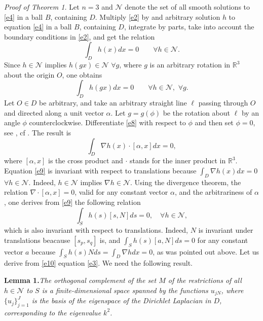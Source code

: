 \documentclass[12pt,leqno]{article}
\def\R{\mathbb{R}}
\begin{document}
{\it Proof of Theorem 1.} Let $n=3$ and $\mathcal{N}$ denote the set of
all smooth solutions to \eqref{e4} in a ball $B$, containing $D$.
Multiply \eqref{e2} by
and arbitrary solution $h$ to equation \eqref{e4} in a ball $B$,
containing $D$, integrate by parts, take into account
the boundary conditions in \eqref{e2}, and get the relation
$$\int_D h(x)dx=0 \qquad \forall h\in \mathcal{N}.$$
Since $h\in \mathcal{N}$ implies $h(gx)\in \mathcal{N}$ $\forall g$,
where $g$ is an arbitrary rotation in $\R^3$ about the origin $O$,
one obtains
\begin{equation}
\label{e8}
\int_D h(gx)dx=0 \qquad \forall h\in \mathcal{N},\,\, \forall g.
\end{equation}
Let $O\in D$ be arbitrary,  and take an arbitrary straight
line $\ell$ passing through $O$ and directed along a
unit vector $\alpha$. Let
$g=g(\phi)$ be the rotation about
$\ell$ by an angle $\phi$ counterclockwise. Differentiate
\eqref{e8} with respect to $\phi$ and then set $\phi=0$, see \cite{R382},
cf \cite{R512}. The result is
\begin{equation}
\label{e9}
\int_D\nabla h(x)\cdot[\alpha, x]dx=0,
\end{equation}
where $[\alpha, x]$ is the cross product and $\cdot$ stands for the inner
product in $\R^3$. Equation  \eqref{e9} is invariant with respect to
translations because $\int_D\nabla h(x)dx=0$ $\forall h\in  \mathcal{N}$.
Indeed,  $h\in  \mathcal{N}$ implies $\nabla h \in  \mathcal{N}$.
Using the divergence theorem, the relation $\nabla \cdot [\alpha, x]=0$,
valid for any constant vector $\alpha$, and the arbitrariness of $\alpha$,
one derives from  \eqref{e9} the following relation
\begin{equation}
\label{e10}
\int_S h(s) [s, N]ds=0,\quad \forall h\in \mathcal{N},
\end{equation}
which is also invariant with respect to translations.
Indeed, $N$ is invariant under translations beacause $[s_p, s_q]$ is,
and $\int_S h(s) [a, N]ds=0$ for any constant vector $a$ because
$\int_S h(s) Nds=\int_D \nabla hdx=0$, as was pointed out above.
Let us derive from \eqref{e10} equation \eqref{e3}.
We need the following result.

{\bf Lemma 1.}{\it  The orthogonal complement of the set $M$ of the
restrictions of all $h\in \mathcal{N}$ to $S$ is a finite-dimensional
space spanned by the functions $u_{jN}$, where $\{u_j\}_{j=1}^J$
is the basis of the eigenspace of the Dirichlet Laplacian in
$D$, corresponding to the eigenvalue $k^2$.}
\end{document}
